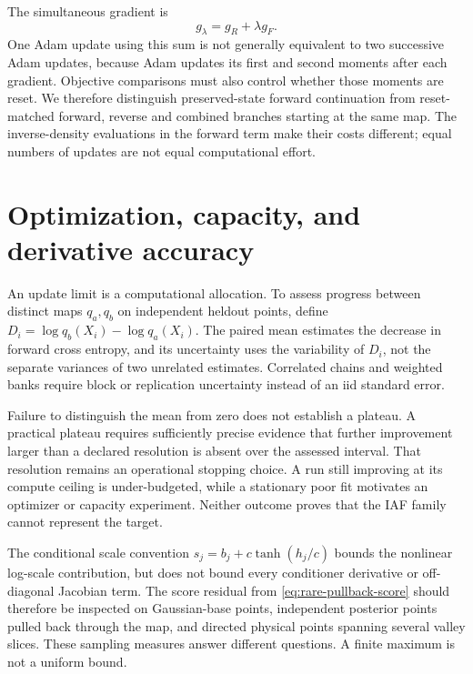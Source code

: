The simultaneous gradient is
\begin{equation}
 g_\lambda=g_R+\lambda g_F.
\end{equation}
One Adam update using this sum is not generally equivalent to two successive
Adam updates, because Adam updates its first and second moments after each
gradient. Objective comparisons must also control whether those moments are
reset. We therefore distinguish preserved-state forward continuation from
reset-matched forward, reverse and combined branches starting at the same map.
The inverse-density evaluations in the forward term make their costs different;
equal numbers of updates are not equal computational effort.

\section[Optimization and geometry]{Optimization, capacity, and derivative accuracy}

An update limit is a computational allocation. To assess progress between
distinct maps $q_a,q_b$ on independent heldout points, define
$D_i=\log q_b(X_i)-\log q_a(X_i)$. The paired mean estimates the decrease
in forward cross entropy, and its uncertainty uses the variability of $D_i$,
not the separate variances of two unrelated estimates. Correlated chains and
weighted banks require block or replication uncertainty instead of an iid
standard error.

Failure to distinguish the mean from zero does not establish a plateau. A
practical plateau requires sufficiently precise evidence that further
improvement larger than a declared resolution is absent over the assessed
interval. That resolution remains an operational stopping choice. A run still
improving at its compute ceiling is under-budgeted, while a stationary poor
fit motivates an optimizer or capacity experiment. Neither outcome proves
that the IAF family cannot represent the target.

The conditional scale convention $s_j=b_j+c\tanh(h_j/c)$ bounds the nonlinear
log-scale contribution, but does not bound every conditioner derivative or
off-diagonal Jacobian term. The score residual from
\eqref{eq:rare-pullback-score} should therefore be inspected on Gaussian-base
points, independent posterior points pulled back through the map, and directed
physical points spanning several valley slices. These sampling measures answer
different questions. A finite maximum is not a uniform bound.

